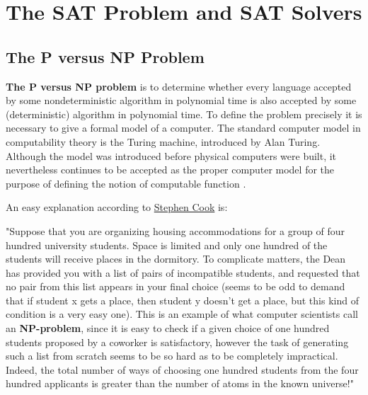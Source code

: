 \documentclass[12pt]{book}
\begin{document}
\chapter{The SAT Problem and SAT Solvers}
\label{cha:SAT Problem and SAT Solvers}
\section{The P versus NP Problem}
\label{sec:The P versus NP Problem}

\begin{defi}\label{def:np} 
      \textbf{The P versus NP problem} is to determine whether every language accepted by some nondeterministic algorithm in polynomial time is also accepted by some
      (deterministic) algorithm in polynomial time. To define the problem precisely it is necessary to give a formal model of a computer.
      The standard computer model in computability theory is the Turing machine, introduced by Alan Turing. Although the model was introduced before physical computers were built, it
      nevertheless continues to be accepted as the proper computer model for the purpose of defining the notion of computable function \cite{h4}.
\end{defi} 
An easy explanation according to \href{http://www.claymath.org/prizeproblems/pvsnp.htm}{Stephen Cook} is:

"Suppose that you are organizing housing accommodations for a group of four hundred university students. Space is limited and only one hundred of the students will receive places in the dormitory. 
To complicate matters, the Dean has provided you with a list of pairs of incompatible students, and requested that no pair from this list appears in your final choice (seems to be odd to demand 
that if student x gets a place, then student y doesn’t get a place, but this kind of condition is a very easy one). This is an example of what computer scientists call an \textbf{NP-problem}, 
since it is easy to check if a given choice of one hundred students proposed by a coworker is satisfactory, however the task of generating such a list from scratch seems to be so hard as to be 
completely impractical. Indeed, the total number of ways of choosing one hundred students from the four hundred applicants is greater than the number of atoms in the known universe!"
\end{document}
